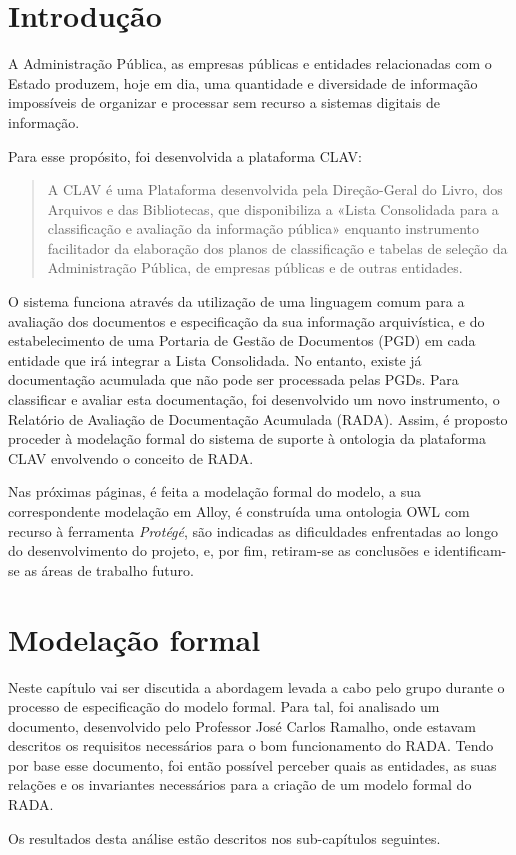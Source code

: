 \documentclass{article}
\begin{document}
\section{Introdução}

A Administração Pública, as empresas públicas e entidades relacionadas com o Estado produzem, hoje em dia, uma quantidade e diversidade de informação impossíveis de organizar e processar sem recurso a sistemas digitais de informação.

Para esse propósito, foi desenvolvida a plataforma CLAV:

\begin{quote}
    A CLAV é uma Plataforma desenvolvida pela Direção-Geral do Livro, dos Arquivos e das Bibliotecas, que disponibiliza a «Lista Consolidada para a classificação e avaliação da informação pública» enquanto instrumento facilitador da elaboração dos planos de classificação e tabelas de seleção da Administração Pública, de empresas públicas e de outras entidades\cite{clav}.
\end{quote}

O sistema funciona através da utilização de uma linguagem comum para a avaliação dos documentos e especificação da sua informação arquivística, e do estabelecimento de uma Portaria de Gestão de Documentos (PGD) em cada entidade que irá integrar a Lista Consolidada. No entanto, existe já documentação acumulada que não pode ser processada pelas PGDs. Para classificar e avaliar esta documentação, foi desenvolvido um novo instrumento, o Relatório de Avaliação de Documentação Acumulada (RADA). Assim, é proposto proceder à modelação formal do sistema de suporte à ontologia da plataforma CLAV envolvendo o conceito de RADA.

Nas próximas páginas, é feita a modelação formal do modelo, a sua correspondente modelação em Alloy, é construída uma ontologia OWL com recurso à ferramenta \emph{Protégé}, são indicadas as dificuldades enfrentadas ao longo do desenvolvimento do projeto, e, por fim, retiram-se as conclusões e identificam-se as áreas de trabalho futuro.

\newpage
\section{Modelação formal} 

\par Neste capítulo vai ser discutida a abordagem levada a cabo pelo grupo durante o processo de especificação do modelo formal. Para tal, foi analisado um documento, desenvolvido pelo Professor José Carlos Ramalho, onde estavam descritos os requisitos necessários para o bom funcionamento do RADA. Tendo por base esse documento, foi então possível perceber quais as entidades, as suas relações e os invariantes necessários para a criação de um modelo formal do RADA. %
\par Os resultados desta análise estão descritos nos sub-capítulos seguintes.
\end{document}
